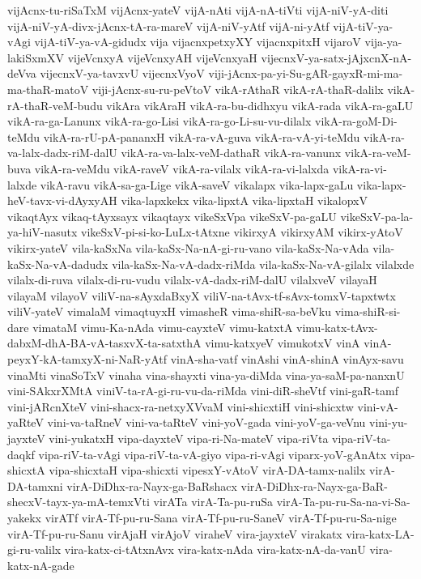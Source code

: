 {vijAcnx-tu-riSaTxM
vijAcnx-yateV
vijA-nAti
vijA-nA-tiVti
vijA-niV-yA-diti
vijA-niV-yA-divx-jAcnx-tA-ra-mareV
vijA-niV-yAtf
vijA-ni-yAtf
vijA-tiV-ya-vAgi
vijA-tiV-ya-vA-gidudx
vija
vijacnxpetxyXY
vijacnxpitxH
vijaroV
vija-ya-lakiSxmXV
vijeVcnxyA
vijeVcnxyAH
vijeVcnxyaH
vijecnxV-ya-satx-jAjxcnX-nA-deVva
vijecnxV-ya-tavxvU
vijecnxVyoV
viji-jAcnx-pa-yi-Su-gAR-gayxR-mi-ma-ma-thaR-matoV
viji-jAcnx-su-ru-peVtoV
vikA-rAthaR
vikA-rA-thaR-dalilx
vikA-rA-thaR-veM-budu
vikAra
vikAraH
vikA-ra-bu-didhxyu
vikA-rada
vikA-ra-gaLU
vikA-ra-ga-Lanunx
vikA-ra-go-Lisi
vikA-ra-go-Li-su-vu-dilalx
vikA-ra-goM-Di-teMdu
vikA-ra-rU-pA-pananxH
vikA-ra-vA-guva
vikA-ra-vA-yi-teMdu
vikA-ra-va-lalx-dadx-riM-dalU
vikA-ra-va-lalx-veM-dathaR
vikA-ra-vanunx
vikA-ra-veM-buva
vikA-ra-veMdu
vikA-raveV
vikA-ra-vilalx
vikA-ra-vi-lalxda
vikA-ra-vi-lalxde
vikA-ravu
vikA-sa-ga-Lige
vikA-saveV
vikalapx
vika-lapx-gaLu
vika-lapx-heV-tavx-vi-dAyxyAH
vika-lapxkekx
vika-lipxtA
vika-lipxtaH
vikalopxV
vikaqtAyx
vikaq-tAyxsayx
vikaqtayx
vikeSxVpa
vikeSxV-pa-gaLU
vikeSxV-pa-la-ya-hiV-nasutx
vikeSxV-pi-si-ko-LuLx-tAtxne
vikirxyA
vikirxyAM
vikirx-yAtoV
vikirx-yateV
vila-kaSxNa
vila-kaSx-Na-nA-gi-ru-vano
vila-kaSx-Na-vAda
vila-kaSx-Na-vA-dadudx
vila-kaSx-Na-vA-dadx-riMda
vila-kaSx-Na-vA-gilalx
vilalxde
vilalx-di-ruva
vilalx-di-ru-vudu
vilalx-vA-dadx-riM-dalU
vilalxveV
vilayaH
vilayaM
vilayoV
viliV-na-sAyxdaBxyX
viliV-na-tAvx-tf-sAvx-tomxV-tapxtwtx
viliV-yateV
vimalaM
vimaqtuyxH
vimasheR
vima-shiR-sa-beVku
vima-shiR-si-dare
vimataM
vimu-Ka-nAda
vimu-cayxteV
vimu-katxtA
vimu-katx-tAvx-dabxM-dhA-BA-vA-tasxvX-ta-satxthA
vimu-katxyeV
vimukotxV
vinA
vinA-peyxY-kA-tamxyX-ni-NaR-yAtf
vinA-sha-vatf
vinAshi
vinA-shinA
vinAyx-savu
vinaMti
vinaSoTxV
vinaha
vina-shayxti
vina-ya-diMda
vina-ya-saM-pa-nanxnU
vini-SAkxrXMtA
viniV-ta-rA-gi-ru-vu-da-riMda
vini-diR-sheVtf
vini-gaR-tamf
vini-jARcnXteV
vini-shacx-ra-netxyXVvaM
vini-shicxtiH
vini-shicxtw
vini-vA-yaRteV
vini-va-taRneV
vini-va-taRteV
vini-yoV-gada
vini-yoV-ga-veVnu
vini-yu-jayxteV
vini-yukatxH
vipa-dayxteV
vipa-ri-Na-mateV
vipa-riVta
vipa-riV-ta-daqkf
vipa-riV-ta-vAgi
vipa-riV-ta-vA-giyo
vipa-ri-vAgi
viparx-yoV-gAnAtx
vipa-shicxtA
vipa-shicxtaH
vipa-shicxti
vipesxY-vAtoV
virA-DA-tamx-nalilx
virA-DA-tamxni
virA-DiDhx-ra-Nayx-ga-BaRshacx
virA-DiDhx-ra-Nayx-ga-BaR-shecxV-tayx-ya-mA-temxVti
virATa
virA-Ta-pu-ruSa
virA-Ta-pu-ru-Sa-na-vi-Sa-yakekx
virATf
virA-Tf-pu-ru-Sana
virA-Tf-pu-ru-SaneV
virA-Tf-pu-ru-Sa-nige
virA-Tf-pu-ru-Sanu
virAjaH
virAjoV
viraheV
vira-jayxteV
virakatx
vira-katx-LA-gi-ru-valilx
vira-katx-ci-tAtxnAvx
vira-katx-nAda
vira-katx-nA-da-vanU
vira-katx-nA-gade
}

